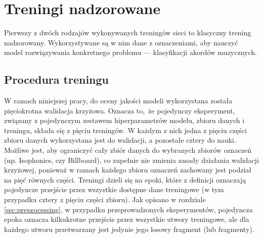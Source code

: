 \section{Treningi nadzorowane}

Pierwszy z dwóch rodzajów wykonywanych treningów sieci to klasyczny trening nadzorowany.  Wykorzystywane są w nim dane z oznaczeniami, aby nauczyć model rozwiązywania konkretnego problemu --- klasyfikacji akordów muzycznych. 


\subsection{Procedura treningu}

W ramach niniejszej pracy, do oceny jakości modeli wykorzystana została pięciokrotna walidacja krzyżowa. Oznacza to, że pojedynczy eksperyment, związany z pojedynczym zestawem hiperparametrów modelu, zbioru danych i treningu, składa się z pięciu treningów. W każdym z nich jedna z pięciu części zbioru danych wykorzystana jest do walidacji, a pozostałe cztery do nauki. Możliwe jest, aby ograniczyć cały zbiór danych do wybranych zbiorów oznaczeń (np. Isophonics, czy Billboard), co zupełnie nie zmienia zasady działania walidacji krzyżowej, ponieważ w ramach każdego zbioru oznaczeń zachowany jest podział na pięć równych części. Treningi dzieli się na epoki, które z definicji oznaczają pojedyncze przejście przez wszystkie dostępne dane treningowe (w tym przypadku cztery z pięciu części zbioru). Jak opisano w rozdziale \ref{sec:preprocessing}, w przypadku przeprowadzonych eksperymentów, pojedyncza epoka oznacza kilkukrotne przejście przez wszystkie utwory treningowe, ale dla każdego utworu przetwarzany jest jedynie jego losowy fragment (lub fragmenty).

